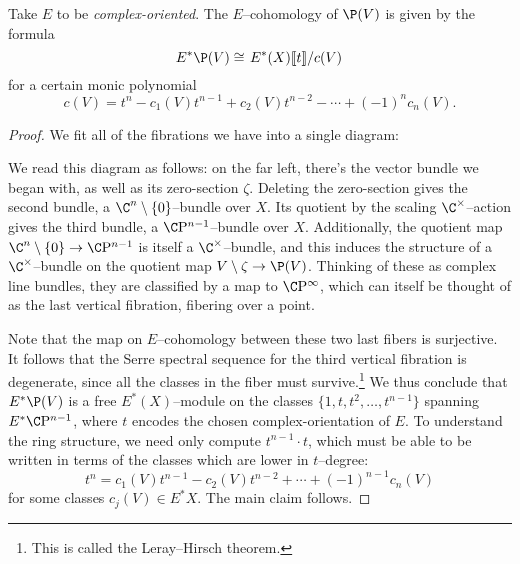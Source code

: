 \begin{theorem}\label{CohomologyOfProjectivization}
Take \(E\) to be \emph{complex-oriented}.  The \(E\)--cohomology of \(\P(V)\) is given by the formula \[E^* \P(V) \cong \left. E^*(X) \llbracket t \rrbracket \middle/ c(V) \right.\] for a certain monic polynomial \[c(V) = t^n - c_1(V) t^{n-1} + c_2(V) t^{n-2} - \cdots + (-1)^n c_n(V).\]
\end{theorem}
\begin{proof}
We fit all of the fibrations we have into a single diagram:
\begin{center}
\end{center}
We read this diagram as follows: on the far left, there's the vector bundle we began with, as well as its zero-section \(\zeta\).  Deleting the zero-section gives the second bundle, a \(\C^n \setminus \{0\}\)--bundle over \(X\).  Its quotient by the scaling \(\C^\times\)--action gives the third bundle, a \(\CP^{n-1}\)--bundle over \(X\).  Additionally, the quotient map \(\C^n \setminus \{0\} \to \CP^{n-1}\) is itself a \(\C^\times\)--bundle, and this induces the structure of a \(\C^\times\)--bundle on the quotient map \(V \setminus \zeta \to \P(V)\).  Thinking of these as complex line bundles, they are classified by a map to \(\CP^\infty\), which can itself be thought of as the last vertical fibration, fibering over a point.

Note that the map on \(E\)--cohomology between these two last fibers is surjective.  It follows that the Serre spectral sequence for the third vertical fibration is degenerate, since all the classes in the fiber must survive.\footnote{This is called the Leray--Hirsch theorem.}  We thus conclude that \(E^* \P(V)\) is a free \(E^*(X)\)--module on the classes \(\{1, t, t^2, \ldots, t^{n-1}\}\) spanning \(E^* \CP^{n-1}\), where \(t\) encodes the chosen complex-orientation of \(E\).  To understand the ring structure, we need only compute \(t^{n-1} \cdot t\), which must be able to be written in terms of the classes which are lower in \(t\)--degree: \[t^n = c_1(V) t^{n-1} - c_2(V) t^{n-2} + \cdots + (-1)^{n-1} c_n(V)\] for some classes \(c_j(V) \in E^* X\).  The main claim follows.
\end{proof}

